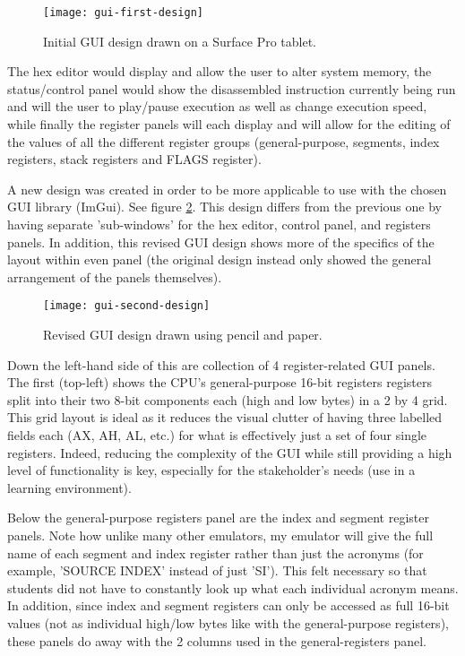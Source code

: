     \begin{figure}
        \centering
        \texttt{[image: gui-first-design]}
        \caption{Initial GUI design drawn on a Surface Pro tablet.}
        \label{figure:gui-first-design}
    \end{figure}

    The hex editor would display and allow the user to alter system memory, the status/control panel would show the disassembled instruction currently being run and will the user to play/pause execution as well as change execution speed, while finally the register panels will each display and will allow for the editing of the values of all the different register groups (general-purpose, segments, index registers, stack registers and FLAGS register).

    A new design was created in order to be more applicable to use with the chosen GUI library (ImGui). See figure \ref{figure:gui-second-design}. This design differs from the previous one by having separate 'sub-windows' for the hex editor, control panel, and registers panels. In addition, this revised GUI design shows more of the specifics of the layout within even panel (the original design instead only showed the general arrangement of the panels themselves).

    \begin{figure}
        \centering
        \texttt{[image: gui-second-design]}
        \caption{Revised GUI design drawn using pencil and paper.}
        \label{figure:gui-second-design}
    \end{figure}

    Down the left-hand side of this are collection of 4 register-related GUI panels. The first (top-left) shows the CPU's general-purpose 16-bit registers registers split into their two 8-bit components each (high and low bytes) in a 2 by 4 grid. This grid layout is ideal as it reduces the visual clutter of having three labelled fields each (AX, AH, AL, etc.) for what is effectively just a set of four single registers. Indeed, reducing the complexity of the GUI while still providing a high level of functionality is key, especially for the stakeholder's needs (use in a learning environment).

    Below the general-purpose registers panel are the index and segment register panels. Note how unlike many other emulators, my emulator will give the full name of each segment and index register rather than just the acronyms (for example, 'SOURCE INDEX' instead of just 'SI'). This felt necessary so that students did not have to constantly look up what each individual acronym means. In addition, since index and segment registers can only be accessed as full 16-bit values (not as individual high/low bytes like with the general-purpose registers), these panels do away with the 2 columns used in the general-registers panel.

